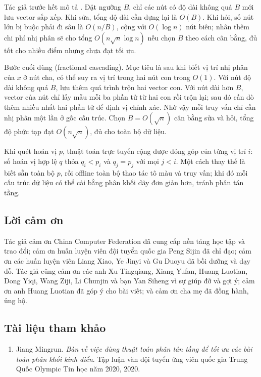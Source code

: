 \documentclass[11pt]{article}
\begin{document}
Tác giả trước hết mô tả . Đặt ngưỡng \(B\), chỉ các nút có
độ dài không quá \(B\) mới lưu vector sắp xếp. Khi sửa, tổng độ dài cần dựng
lại là \(O(B)\). Khi hỏi, số nút lớn bị buộc phải đi sâu là \(O(n/B)\), cộng
với \(O(\log n)\) nút biên; nhân thêm chi phí nhị phân sẽ cho tổng
\(O(n\sqrt n\log n)\) nếu chọn \(B\) theo cách cân bằng, đủ tốt cho nhiều điểm
nhưng chưa đạt tối ưu.

Bước cuối dùng  (fractional cascading). Mục tiêu là sau khi
biết vị trí nhị phân của \(x\) ở nút cha, có thể suy ra vị trí trong hai nút
con trong \(O(1)\). Với nút độ dài không quá \(B\), lưu thêm quá trình trộn
hai vector con. Với nút dài hơn \(B\), vector của nút chỉ lấy mẫu mỗi ba phần
tử từ hai con rồi trộn lại; sau đó cần dò thêm nhiều nhất hai phần tử để định
vị chính xác. Nhờ vậy mỗi truy vấn chỉ cần nhị phân một lần ở gốc cấu trúc.
Chọn \(B=O(\sqrt n)\) cân bằng sửa và hỏi, tổng độ phức tạp đạt
\(O(n\sqrt n)\), đủ cho toàn bộ dữ liệu.

Khi quét hoán vị \(p\), thuật toán trực tuyến cộng được đóng góp của từng vị
trí \(i\): số hoán vị hợp lệ \(q\) thỏa \(q_i<p_i\) và \(q_j=p_j\) với mọi
\(j<i\). Một cách thay thế là biết sẵn toàn bộ \(p\), rồi offline toàn bộ thao
tác tô màu và truy vấn; khi đó mỗi cấu trúc dữ liệu có thể cài bằng phân khối
dãy đơn giản hơn, tránh phân tán tầng.

\subsection*{Lời cảm ơn}

Tác giả cảm ơn China Computer Federation đã cung cấp nền tảng học tập và trao
đổi; cảm ơn huấn luyện viên đội tuyển quốc gia Peng Sijin đã chỉ đạo; cảm ơn
các huấn luyện viên Liang Xiao, Ye Jinyi và Gu Duoyu đã bồi dưỡng và dạy dỗ.
Tác giả cũng cảm ơn các anh Xu Tingqiang, Xiang Yufan, Huang Luotian, Dong
Yiqi, Wang Ziji, Li Chunjin và bạn Yan Siheng vì sự giúp đỡ và gợi ý; cảm ơn
anh Huang Luotian đã góp ý cho bài viết; và cảm ơn cha mẹ đã đồng hành, ủng
hộ.

\subsection*{Tài liệu tham khảo}

\begin{enumerate}
  \item Jiang Mingrun. \emph{Bàn về việc dùng thuật toán phân tán tầng để tối
  ưu các bài toán phân khối kinh điển}. Tập luận văn đội tuyển ứng viên quốc
  gia Trung Quốc Olympic Tin học năm 2020, 2020.
\end{enumerate}
\end{document}
